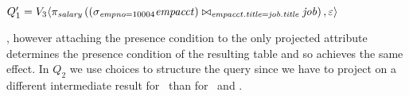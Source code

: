 $Q_1' = \chc[\vThree]{\vPrj[\salary]{  \left(\joinRelR{\selectRel{\empno=10004}{\empacct}}{\job}
           {\empacct.\titleatt = \job.\titleatt}\right)},\empRel}$
           
           , however attaching the presence
condition to the only projected attribute determines the presence condition of
the resulting table and so achieves the same effect.
%
In $Q_2$ we use choices to structure the query since we have to project on a
different intermediate result for \vFive\ than for \vThree\ and \vFour.



